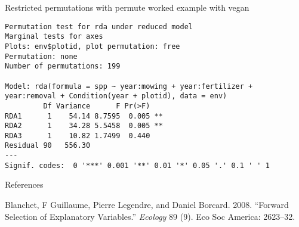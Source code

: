 \documentclass[10pt,ignorenonframetext,compress, aspectratio=169]{beamer}
\begin{document}
\begin{frame}[fragile]{Restricted permutations with permute \textbar{}
worked example with vegan}
\begin{verbatim}
Permutation test for rda under reduced model
Marginal tests for axes
Plots: env$plotid, plot permutation: free
Permutation: none
Number of permutations: 199

Model: rda(formula = spp ~ year:mowing + year:fertilizer + year:removal + Condition(year + plotid), data = env)
         Df Variance      F Pr(>F)   
RDA1      1    54.14 8.7595  0.005 **
RDA2      1    34.28 5.5458  0.005 **
RDA3      1    10.82 1.7499  0.440   
Residual 90   556.30                 
---
Signif. codes:  0 '***' 0.001 '**' 0.01 '*' 0.05 '.' 0.1 ' ' 1
\end{verbatim}

\normalsize

\end{frame}

\begin{frame}{References}

Blanchet, F Guillaume, Pierre Legendre, and Daniel Borcard. 2008.
``Forward Selection of Explanatory Variables.'' \emph{Ecology} 89 (9).
Eco Soc America: 2623--32.

\end{frame}
\end{document}

